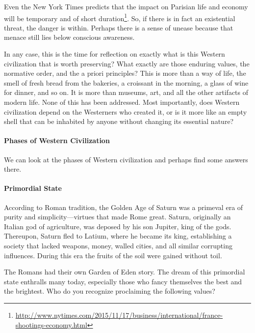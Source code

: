 Even the New York Times predicts that the impact on Parisian life and economy will be temporary and of short duration\footnote{\url{http://www.nytimes.com/2015/11/17/business/international/france-shootings-economy.html}}. So, if there is in fact an existential threat, the danger is within. Perhaps there is a sense of unease because that menace still lies below conscious awareness.

In any case, this is the time for reflection on exactly what is this Western civilization that is worth preserving? What exactly are those enduring values, the normative order, and the a priori principles? This is more than a way of life, the smell of fresh bread from the bakeries, a croissant in the morning, a glass of wine for dinner, and so on. It is more than museums, art, and all the other artifacts of modern life. None of this has been addressed. Most importantly, does Western civilization depend on the Westerners who created it, or is it more like an empty shell that can be inhabited by anyone without changing its essential nature?

\paragraph{Phases of Western Civilization}


We can look at the phases of Western civilization and perhaps find some answers there.

\paragraph{Primordial State}


\begin{quotex}
According to Roman tradition, the Golden Age of Saturn was a primeval era of purity and simplicity---virtues that made Rome great. Saturn, originally an Italian god of agriculture, was deposed by his son Jupiter, king of the gods. Thereupon, Saturn fled to Latium, where he became its king, establishing a society that lacked weapons, money, walled cities, and all similar corrupting influences. During this era the fruits of the soil were gained without toil.
\end{quotex}


The Romans had their own Garden of Eden story. The dream of this primordial state enthralls many today, especially those who fancy themselves the best and the brightest. Who do you recognize proclaiming the following values?

